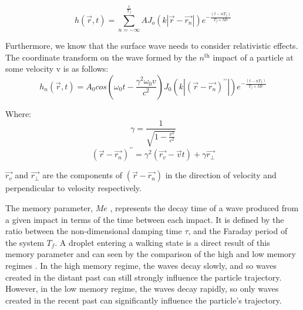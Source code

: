 \begin{equation}
h(\vec{r} , t) = \sum_{n=-\infty}^{\frac{t}{T_f}} A J_o\left(k\left|\vec{r} - \vec{r_n}\right| \right) e^{-\frac{\left(t-n T_f\right)}{T_f\times Me}}
\label{equ:heightSumSurfaceWaves}
\end{equation}

Furthermore, we know that the surface wave needs to consider relativistic effects. The coordinate transform on the wave formed by the $n^{\textrm{th}}$ impact of a particle at some velocity v is as follows:
\begin{equation}
h_n(\vec{r} , t) = A_0 cos\left(\omega_0 t - \frac{\gamma^2 \omega_0 v}{c^2}\right) J_0\left(k \left| \left(\vec{r} - \vec{r_n}\right)^{\prime \prime}  \right| \right)e^{-\frac{\left(t-n T_f\right)}{T_f\times Me}}
\end{equation}

Where:
\begin{equation}
\gamma = \frac{1}{\sqrt{1-\frac{v^2}{c^2}}}
\end{equation}
\begin{equation}
\left(\vec{r} - \vec{r_n}\right)^{\prime \prime} = \gamma^2(\vec{r_v}-\vec{v}t)+\gamma\vec{r_{\perp}}
\end{equation}

$\vec{r_v}$ and $\vec{r_{\perp}}$ are the components of $\left(\vec{r} - \vec{r_n}\right)$ in the direction of velocity and perpendicular to velocity respectively.

The memory parameter,  $Me$ , represents the decay time of a wave produced from a given impact in terms of the time between each impact. It is defined by the ratio between the non-dimensional damping time $\tau$, and the Faraday period of the system $T_f$.
A droplet entering a walking state is a direct result of this memory parameter and can seen by the comparison of the high and low memory regimes \cite{couder11}.
In the high memory regime, the waves decay slowly, and so waves created in the distant past can still strongly influence the particle trajectory. However, in the low memory regime, the waves decay rapidly, so only waves created in the recent past can significantly influence the particle's trajectory. 